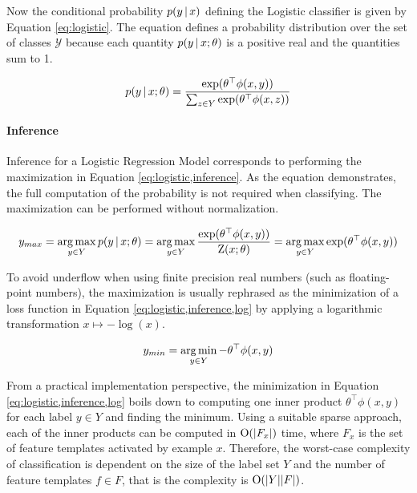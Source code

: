 Now the conditional probability $p(y\mbox{$ \, | \, $} x)$ defining the Logistic
classifier is given by Equation \eqref{eq:logistic}. The equation
defines a probability distribution over the set of classes
$\mathcal{Y}$ because each quantity $p(y\mbox{$ \, | \, $} x\mbox{$ ; \, $}\theta)$ is a
positive real and the quantities sum to 1.

\begin{equation}
p(y\mbox{$ \, | \, $} x\mbox{$ ; \, $} \theta) = \frac{\exp(\theta^\top \phi(x,y))}{\sum_{z \in Y}\exp(\theta^\top \phi(x,z))}\label{eq:logistic}
\end{equation}

\paragraph{Inference} Inference for a Logistic Regression Model
corresponds to performing the maximization in Equation \ref{eq:logistic,inference}. As the equation demonstrates, the full computation of the probability is not required when classifying. The maximization can be performed without normalization.

\begin{equation}y_{max} = \operatorname*{arg\,max}_{y \in Y} p(y\mbox{$ \, | \, $} x\mbox{$ ; \, $} \theta) = \operatorname*{arg\,max}_{y\in Y} \frac{\exp(\theta^\top \phi(x,y))}{\mbox{${\rm Z}$}(x;\theta)} = \operatorname*{arg\,max}_{y \in Y} \exp(\theta^\top \phi(x,y))\label{eq:logistic,inference}\end{equation}

To avoid underflow when using finite precision real numbers (such as
floating-point numbers), the maximization is usually rephrased as the
minimization of a loss function in Equation
\ref{eq:logistic,inference,log} by applying a logarithmic
transformation $x \mapsto -\log(x)$.

\begin{equation}y_{min} = \operatorname*{arg\,min}_{y\in Y} -\theta^\top \phi(x,y)\label{eq:logistic,inference,log}\end{equation}

From a practical implementation perspective, the minimization in
Equation \ref{eq:logistic,inference,log} boils down to computing one
inner product $\theta^\top \phi(x,y)$ for each label $y \in Y$ and
finding the minimum. Using a suitable sparse approach, each of the
inner products can be computed in $\mbox{${\rm O}$}(|F_x|)$ time, where $F_x$ is the
set of feature templates activated by example $x$. Therefore, the
worst-case complexity of classification is dependent on the size of
the label set $Y$ and the number of feature templates $f \in F$, that
is the complexity is $\mbox{${\rm O}$}(|Y||F|)$.

